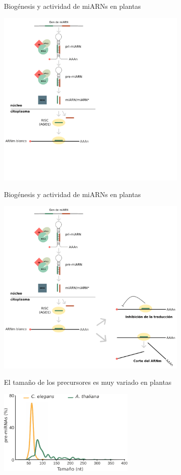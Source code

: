 \documentclass{beamer}
\begin{document}
\begin{frame}{Biogénesis y actividad de miARNs en plantas}
	\begin{center}
		\includegraphics[width=0.7\textwidth]{img/biogenesis_accion_defensa03.png}
	\end{center}
\end{frame}

\begin{frame}{Biogénesis y actividad de miARNs en plantas}
	\begin{center}
		\includegraphics[width=0.7\textwidth]{img/biogenesis_accion_defensa04.png}
	\end{center}
\end{frame}

\begin{frame}{El tamaño de los precursores es muy variado en plantas}
	\begin{center}
		\includegraphics[width=0.5\textwidth]{img/distribucion_precursores.png}
	\end{center}
\end{frame}
\end{document}
